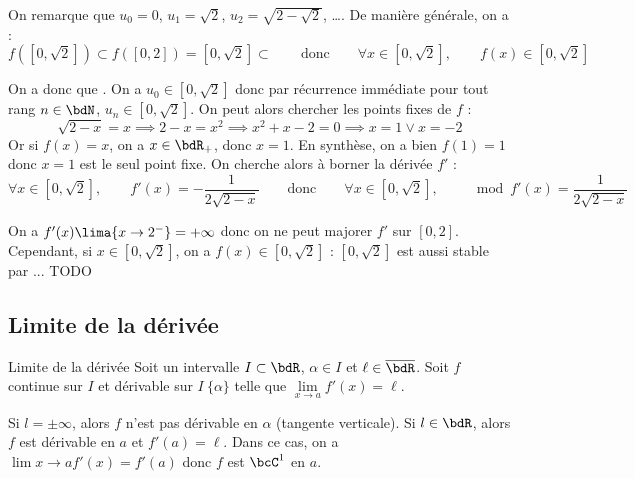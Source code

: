 \documentclass[a4paper,french,bookmarks]{article}
\begin{document}
\begin{example}{}{}
        On remarque que $u_0 = 0$, $u_1 = \sqrt{2}$, $u_2 = \sqrt{2 - \sqrt{2}}$, \dots. De manière générale, on a :
        \[f\left(\left[0, \sqrt{2}\right]\right) \subset f\left(\left[0, 2\right]\right) = \left[0, \sqrt{2}\right] \subset \qquad\text{donc}\qquad \forall x \in \left[0, \sqrt{2}\right],\qquad f(x) \in \left[0, \sqrt{2}\right] \]
        
        On a donc que . On a $u_0 \in \left[0, \sqrt{2}\right]$ donc par récurrence immédiate pour tout rang $n \in \bdN$, $u_n \in \left[0, \sqrt{2}\right]$. On peut alors chercher les points fixes de $f$ :
        \[ \sqrt{2-x} = x \implies 2-x = x^2 \implies x^2 + x - 2 = 0 \implies x = 1 \lor x= -2\]
        Or si $f(x) = x$, on a $x \in \bdR_+$, donc $x = 1$. En synthèse, on a bien $f(1) = 1$ donc $x = 1$ est le seul point fixe. On cherche alors à borner la dérivée $f'$ : 
        \[ \forall x \in \left[0, \sqrt{2}\right],\qquad f'(x) = -\dfrac{1}{2\sqrt{2-x}} \qquad\text{donc}\qquad \forall x \in \left[0, \sqrt{2}\right],\qquad \mod{f'(x)} = \dfrac{1}{2\sqrt{2-x}}\]
        
        On a $f'(x) \lima{x \to 2^-} = +\infty$ donc on ne peut majorer $f'$ sur $\left[0, 2\right]$. Cependant, si $x \in \left[0, \sqrt{2}\right]$, on a $f(x) \in \left[0, \sqrt{2}\right]$ : $\left[0, \sqrt{2}\right]$ est aussi stable par ... TODO
    \end{example}
    
    \subsection{Limite de la dérivée}
    
    \begin{theorem}{Limite de la dérivée}{}
        Soit un intervalle $I \subset \bdR$, $\alpha \in I$ et $\ell \in \overline \bdR$. Soit $f$ continue sur $I$ et dérivable sur $I \ \{ \alpha\}$ telle que $\lim\limits_{x \to a} f'(x) = \ell$.
        
        \begin{enumerate}
            \ithand Si $l = \pm \infty$, alors $f$ n'est pas dérivable en $\alpha$ (tangente verticale).
            \ithand Si $l \in \bdR$, alors $f$ est dérivable en $a$ et $f'(a) = \ell$. Dans ce cas, on a $\lim\limits{x \to a} f'(x) = f'(a)$ donc $f$ est $\bcC^1$ en $a$.
        \end{enumerate}
    \end{theorem}
    
\end{document}
